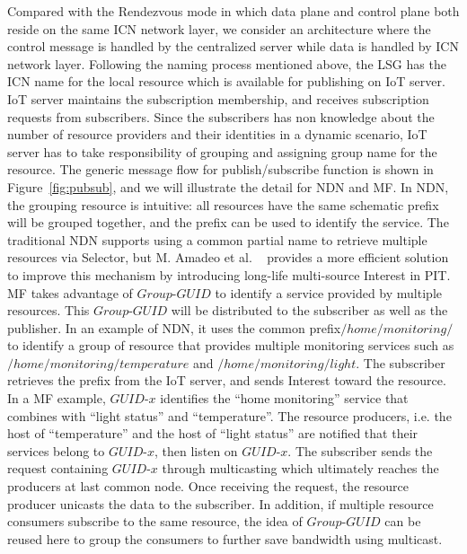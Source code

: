 Compared with the Rendezvous mode in which data plane and control plane both reside on the same ICN network layer, we consider an architecture where the control message is handled by the centralized server while data is handled by ICN network layer.  Following the naming process mentioned above, the LSG has the ICN name for the local resource which is available for publishing on IoT server.  IoT server maintains the subscription membership, and receives subscription requests from subscribers. Since the subscribers has non knowledge about the number of resource providers and their identities  in a dynamic scenario,  IoT server has to take responsibility of grouping and assigning group name for the resource. The generic message flow for publish/subscribe function is shown in Figure~\ref{fig:pubsub}, and we will illustrate the detail for NDN and MF.
In NDN, the grouping resource is intuitive: all resources have the same schematic prefix will be grouped together, and the prefix can be used to identify the service. The traditional NDN supports using a common partial name to retrieve multiple resources via Selector, but M. Amadeo et al. ~\cite{amadeo2014multi} provides a more efficient solution to improve this mechanism by introducing long-life multi-source Interest in PIT. MF takes advantage of  $Group$-$GUID$ to identify a service provided by multiple resources. This $Group$-$GUID$ will be distributed to the subscriber as well as the publisher. In an example of NDN,  it uses the common prefix$/home/monitoring/$ to identify a group of resource that provides multiple monitoring services such as $/home/monitoring/temperature$ and $/home/monitoring/light$. The subscriber retrieves the prefix from the IoT server, and sends Interest toward the resource. In a MF example, $GUID$-$x$ identifies the ``home monitoring'' service that combines with ``light status'' and ``temperature''. The resource producers, i.e. the host of ``temperature'' and the host of ``light status'' are notified that their services belong to $GUID$-$x$, then listen on $GUID$-$x$. The subscriber sends the request containing  $GUID$-$x$ through multicasting which ultimately reaches the producers at last common node. Once receiving the request, the resource producer unicasts the data to the subscriber. In addition, if multiple resource consumers subscribe to the same resource, the idea of $Group$-$GUID$ can be reused here to group the consumers to further save bandwidth using multicast.

